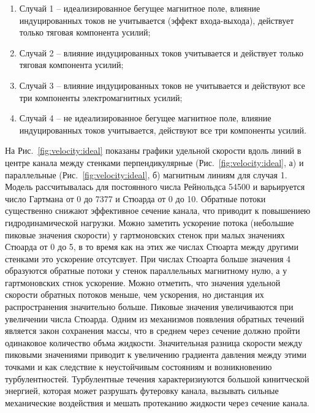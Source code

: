 \begin{enumerate}
    \item Случай 1 -- идеализированное бегущее магнитное поле, влияние индуцированных токов не учитывается (эффект входа-выхода), действует только тяговая компонента усилий;
    \item Случай 2 --  влияние индуцированных токов учитывается и действует только тяговая компонента усилий;
    \item Случай 3 -- влияние индуцированных токов не учитывается и действуют все три компоненты электромагнитных усилий;
    \item Случай 4 -- не идеализированное бегущее магнитное поле, влияние индуцированных токов учитывается, действуют все три компоненты усилий. 
\end{enumerate}

На Рис.~\ref{fig:velocity:ideal} показаны графики удельной скорости вдоль линий в центре канала между стенками перпендикулярные (Рис.~\ref{fig:velocity:ideal}, а) и параллельные (Рис.~\ref{fig:velocity:ideal}, б) магнитным линиям для случая 1. Модель рассчитывалась для постоянного числа Рейнольдса 54500 и варьируется число Гартмана от 0 до 7377 и Стюарда от 0 до 10. Обратные потоки существенно снижают эффективное сечение канала, что приводит к повышениею гидродинамической нагрузки. Можно заметить ускорение потока (небольшие пиковые значения скорости) у гартмоновских стенок при малых значениях Стюарда от 0 до 5, в то время как на этих же числах Стюарта между другими стенками это ускорение отсутсвует. При числах Стюарта больше значения 4 образуются обратные потоки у стенок параллельных магнитному нулю, а у гартмоновских стнок ускорение. Можно отметить, что значения удельной скорости обратных потоков меньше, чем ускорения, но дистанция их распространения значительно больше. Пиковые значения увеличиваются при увеличении числа Стюарда. Одним из механизмов появления обратных течений является закон сохранения массы, что в среднем через сечение должно пройти одинаковое количество объма жидкости. Значительная разница скорости между пиковыми значениями приводит к увеличению градиента давления между этими точками и как следствие к неустойчивым состояниям и возникновению турбулентностей. Турбулентные течения характеризиуются большой кинитческой энергией, которая может разрушать футеровку канала, вызывать сильные механические воздействия и мешать протеканию жидкости через сечение канала.


